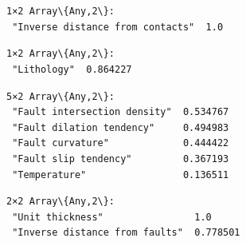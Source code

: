 \documentclass[11pt]{article}
\begin{document}
    \begin{center}
    \end{center}
    { \hspace*{\fill} \\}
    
    \begin{Verbatim}[commandchars=\\\{\}]

    \end{Verbatim}

    \begin{center}
    \end{center}
    { \hspace*{\fill} \\}
    
    \begin{Verbatim}[commandchars=\\\{\}]

    \end{Verbatim}

    
    \begin{Verbatim}[commandchars=\\\{\}]
1×2 Array\{Any,2\}:
 "Inverse distance from contacts"  1.0
    \end{Verbatim}

    
    
    \begin{Verbatim}[commandchars=\\\{\}]
1×2 Array\{Any,2\}:
 "Lithology"  0.864227
    \end{Verbatim}

    
    
    \begin{Verbatim}[commandchars=\\\{\}]
5×2 Array\{Any,2\}:
 "Fault intersection density"  0.534767
 "Fault dilation tendency"     0.494983
 "Fault curvature"             0.444422
 "Fault slip tendency"         0.367193
 "Temperature"                 0.136511
    \end{Verbatim}

    
    
    \begin{Verbatim}[commandchars=\\\{\}]
2×2 Array\{Any,2\}:
 "Unit thickness"                1.0
 "Inverse distance from faults"  0.778501
    \end{Verbatim}
\end{document}
